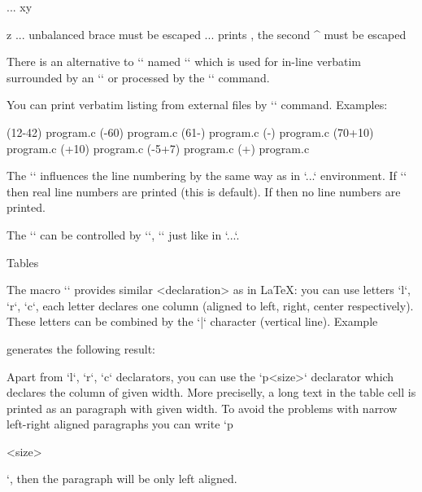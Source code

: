         ... xy{z ... unbalanced brace must be escaped
         ... prints ^^M, the second ^ must be escaped
\endtt

There is an alternative to `\tthook` named `\intthook` which is used for
in-line verbatim surrounded by an `\activettchar` or processed by the `\code`
command.

You can print verbatim listing from external files by `\verbinput` command. 
Examples:

\begtt
\verbinput (12-42) program.c  %
\verbinput (-60) program.c    % print from begin to the line 60
\verbinput (61-) program.c    % from line 61 to the end
\verbinput (-) program.c      % whole file is printed
\verbinput (70+10) program.c  % from line 70, only 10 lines printed
\verbinput (+10) program.c    % from the last line read, print 10 lines 
\vebrinput (-5+7) program.c   %
\verbinput (+) program.c      % from the last line read to the end
\endtt


The `\ttline` influences the line numbering by the same way as in
`\begtt...\endtt` environment. If `` then real line numbers are
printed (this is default). If  then no line 
numbers are printed.

The `\verbinput` can be controlled by `\tthook`, `\ttindent` just like
in `\begtt...\endtt`.


\sec Tables

The macro `` provides similar <declaration>
as in \LaTeX: you can use letters `l`, `r`, `c`, each letter declares 
one column (aligned to left, right, center respectively). 
These letters can be combined by the `|` character (vertical line). Example

\begtt
{}
\endtt
%
generates the following result:

\bigskip
\hfil{}
\bigskip

Apart from `l`, `r`, `c` declarators, you can use the `p{<size>}` declarator
which declares the column of given width. More preciselly, a long text in
the table cell is printed as an paragraph with given width.
To avoid the problems with narrow left-right aligned paragraphs you can write
`p{<size>\raggedright}`, then the paragraph will be only left aligned.

}

